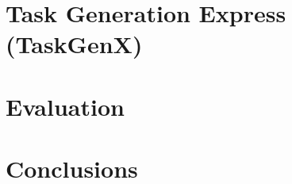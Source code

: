 \section{Task Generation Express (TaskGenX)}
\label{sec.taskgenx.ram}






\section{Evaluation}
\label{sec.taskgenx.evaluation}


%

\section{Conclusions}
\label{sec.taskgenx.conclusions}


